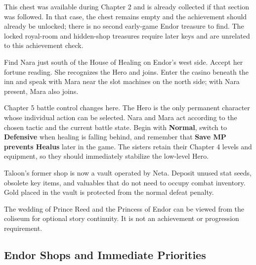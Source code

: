 \documentclass[
  american,
  10pt,
  letterpaper,
  oneside,
  open=any]{scrreprt}
\begin{document}
This chest was available during Chapter 2 and is already collected if
that section was followed. In that case, the chest remains empty and the
achievement should already be unlocked; there is no second early-game
Endor treasure to find. The locked royal-room and hidden-shop treasures
require later keys and are unrelated to this achievement check.

Find Nara just south of the House of Healing on Endor's west side.
Accept her fortune reading. She recognizes the Hero and joins. Enter the
casino beneath the inn and speak with Mara near the slot machines on the
north side; with Nara present, Mara also joins.

Chapter 5 battle control changes here. The Hero is the only permanent
character whose individual action can be selected. Nara and Mara act
according to the chosen tactic and the current battle state. Begin with
\textbf{Normal}, switch to \textbf{Defensive} when healing is falling
behind, and remember that \textbf{Save MP prevents Healus} later in the
game. The sisters retain their Chapter 4 levels and equipment, so they
should immediately stabilize the low-level Hero.

Taloon's former shop is now a vault operated by Neta. Deposit unused
stat seeds, obsolete key items, and valuables that do not need to occupy
combat inventory. Gold placed in the vault is protected from the normal
defeat penalty.

The wedding of Prince Reed and the Princess of Endor can be viewed from
the coliseum for optional story continuity. It is not an achievement or
progression requirement.

\subsection{Endor Shops and Immediate
Priorities}\label{endor-shops-and-immediate-priorities}
\end{document}
